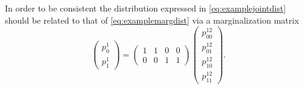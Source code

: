 In order to be consistent the distribution expressed in \ref{eq:examplejointdist} should be related to that of \ref{eq:examplemargdist} via a marginalization matrix
\begin{equation}
\begin{pmatrix}
p^{1}_{0}\\
p^{1}_{1}
\end{pmatrix} = \begin{pmatrix}
1 & 1 & 0 & 0\\
0 & 0 & 1 & 1
\end{pmatrix}
\begin{pmatrix}
p^{12}_{00}\\
p^{12}_{01}\\
p^{12}_{10}\\
p^{12}_{11}
\end{pmatrix}.
\end{equation}


